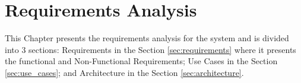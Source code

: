 \chapter{Requirements Analysis}
\label{ch:requirements_analysis}

This Chapter presents the requirements analysis for the system and is divided
into 3 sections: Requirements in the Section \ref{sec:requirements} where it
presents the functional and Non-Functional Requirements; Use Cases in the
Section \ref{sec:use_cases}; and Architecture in the Section
\ref{sec:architecture}.




